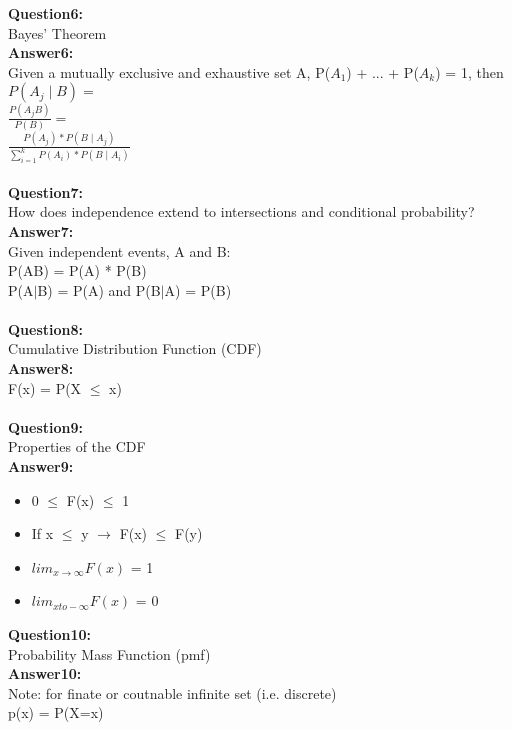 \documentclass{article}
\begin{document}
\textbf{Question6:} \\
Bayes' Theorem 
\\
\textbf{Answer6:} \\
Given a mutually exclusive and exhaustive set A, P($A_1$) + ... + P($A_k$) = 1, then\\
$P(A_j \mid B) = $\\
$\frac{P(A_jB)}{P(B)} = $\\
$\frac{P(A_j) * P(B \mid A_j)}{\sum_{i=1}^k P(A_i) * P(B \mid A_i)}$
\\\\


\textbf{Question7:} \\
How does independence extend to intersections and conditional probability?
\\
\textbf{Answer7:} \\
Given independent events, A and B:\\
P(AB) = P(A) * P(B)\\
P(A$\mid$B) = P(A) and P(B$\mid$A) = P(B)
\\\\


\textbf{Question8:} \\
Cumulative Distribution Function (CDF)
\\
\textbf{Answer8:} \\
F(x) = P(X $\leq$ x)
\\\\


\textbf{Question9:} \\
Properties of the CDF
\\
\textbf{Answer9:} \\
\begin{itemize}
	\item 0 $\leq$ F(x) $\leq$ 1
	\item If x $\leq$ y $\rightarrow$ F(x) $\leq$ F(y)
	\item $lim_ {x \to \infty} F (x)$ = 1
	\item $lim_ {x to -\infty} F (x)$ = 0
\end{itemize}


\textbf{Question10:} \\
Probability Mass Function (pmf)
\\
\textbf{Answer10:} \\
Note: for finate or coutnable infinite set (i.e. discrete)\\
p(x) = P(X=x)
\\\\
\end{document}

